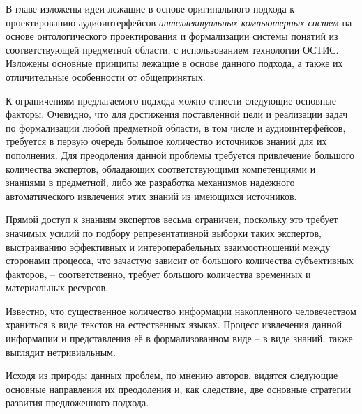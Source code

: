В главе изложены идеи лежащие в основе оригинального подхода к проектированию аудиоинтерфейсов \textit{интеллектуальных компьютерных систем} на основе онтологического проектирования и формализации системы понятий из соответствующей предметной области, с использованием технологии ОСТИС. Изложены основные принципы лежащие в основе данного подхода, а также их отличительные особенности от общепринятых.

К ограничениям предлагаемого подхода можно отнести следующие основные факторы. Очевидно, что для достижения поставленной цели и реализации задач по формализации любой предметной области, в том числе и аудиоинтерфейсов, требуется в первую очередь большое количество источников знаний для их пополнения. Для преодоления данной проблемы требуется привлечение большого количества экспертов, обладающих соответствующими компетенциями и знаниями в предметной, либо же разработка механизмов надежного автоматического извлечения этих знаний из имеющихся источников.

Прямой доступ к знаниям экспертов весьма ограничен, поскольку это требует значимых усилий по подбору репрезентативной выборки таких экспертов, выстраиванию эффективных и интероперабельных взаимоотношений между сторонами процесса, что зачастую зависит от большого количества субъективных факторов, – соответственно, требует большого количества временных и материальных ресурсов.

Известно, что существенное количество информации накопленного человечеством храниться в виде текстов на естественных языках. Процесс извлечения данной информации и представления её в формализованном виде – в виде знаний, также выглядит нетривиальным.
 
Исходя из природы данных проблем, по мнению авторов, видятся следующие основные направления их преодоления и, как следствие, две основные стратегии развития предложенного подхода.

